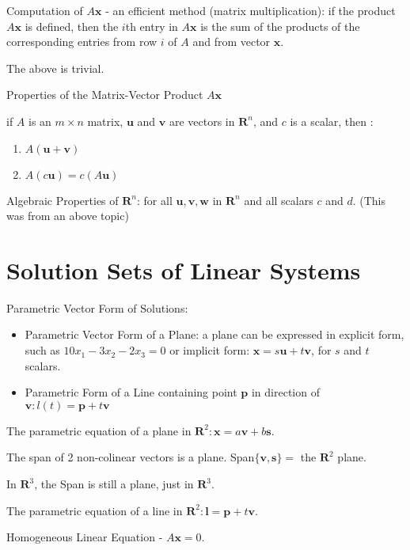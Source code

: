 \documentclass[../linalg.tex]{subfiles}
\begin{document}
Computation of $A\textbf{x}$ - an efficient method (matrix multiplication): if the product $A\textbf{x}$ is defined, then the $i$th entry in $A\textbf{x}$ is the sum of the products of the corresponding entries from row $i$ of $A$ and from vector $\textbf{x}$.

The above is trivial.

Properties of the Matrix-Vector Product $A\textbf{x}$
\begin{theorem}
    if $A$ is an $m\times n$ matrix, $\textbf{u}$ and $\textbf{v}$ are vectors in $\textbf{R}^n$, and $c$ is a scalar, then : 
    \begin{enumerate}
        \item $A(\textbf{u}+\textbf{v})$
        \item $A(c\textbf{u})=c(A\textbf{u})$
    \end{enumerate}
\end{theorem}

Algebraic Properties of $\textbf{R}^n$: for all $\textbf{u},\textbf{v},\textbf{w}$ in $\textbf{R}^n$ and all scalars $c$ and $d$. (This was from an above topic)



\section{Solution Sets of Linear Systems}
Parametric Vector Form of Solutions:
\begin{itemize}
    \item Parametric Vector Form of a Plane: a plane can be expressed in explicit form, such as $10x_1-3x_2-2x_3=0$ or implicit form: $\textbf{x}=s\textbf{u}+t\textbf{v}$, for $s$ and $t$ scalars.
    \item Parametric Form of a Line containing point $\textbf{p}$ in direction of $\textbf{v}: l(t)=\textbf{p}+t\textbf{v}$
\end{itemize}

The parametric equation of a plane in $\textbf{R}^2: \textbf{x}=a\textbf{v}+b\textbf{s}$.

The span of 2 non-colinear vectors is a plane. Span$\{\textbf{v},\textbf{s}\} = $ the $\textbf{R}^2$ plane.

In $\textbf{R}^3$, the Span is still a plane, just in $\textbf{R}^3$.

The parametric equation of a line in $\textbf{R}^2: \textbf{l}=\textbf{p}+t\textbf{v}$.

Homogeneous Linear Equation - $A\textbf{x}=0$.
\end{document}
